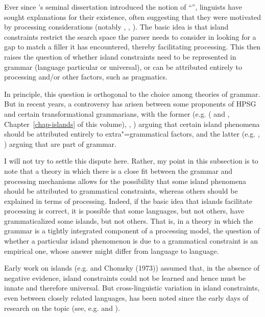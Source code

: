 \documentclass[a4paper]{article}
\begin{document}
Ever since \citeauthor{Ross67}'s seminal dissertation \citeyearpar{Ross67} introduced the notion of ``'', linguists have sought explanations for their existence, often suggesting that they were motivated by processing considerations (notably \citet{Grosu72-u}, \citet{Fodor83}, \citet{Deane91}).  The basic idea is that island constraints restrict the search space the parser needs to consider in looking for a gap to match a filler it has encountered, thereby facilitating processing.  This then raises the question of whether island constraints need to be represented in grammar (language particular or universal), or can be attributed entirely to processing and/or other factors, such as pragmatics.

In principle, this question is orthogonal to the choice among theories of grammar.  But in recent
years, a controversy has arisen between some proponents of HPSG and certain transformational
grammarians, with the former (e.g. \citeauthor{Chaves2012} (\citeyear{Chaves2012} and
\citeyear{chapters/islands}, Chapter~\ref{chap-islands} of this volume), \citet{HofmeisterSag2010}, \citet*{HofmeisterEtal2013}) arguing that certain island phenomena should be attributed entirely to extra"=grammatical factors, and the latter (e.g. \citet{Phillips2013}, \citet{SWP2012a-u}) arguing that  are part of grammar.

I will not try to settle this dispute here.  Rather, my point in this subsection is to note that a theory in which there is a close fit between the grammar and processing mechanisms allows for the possibility that some island phenomena should be attributed to grammatical constraints, whereas others should be explained in terms of processing.  Indeed, if the basic idea that islands facilitate processing is correct, it is possible that some languages, but not others, have grammaticalized some islands, but not others.  That is, in a theory in which the grammar is a tightly integrated component of a processing model, the question of whether a particular island phenomenon is due to a grammatical constraint is an empirical one, whose answer might differ from language to language. 

Early work on islands (e.g. \citet{Ross67} and Chomsky (1973)) assumed that, in the absence of negative evidence, island constraints could not be learned and hence must be innate and therefore universal.  But cross-linguistic variation in island constraints, even between closely related languages, has been noted since the early days of research on the topic (see, e.g. \citet{Erteschik73a-u} and \citet{EngdahlEjerhed82}).
\end{document}
